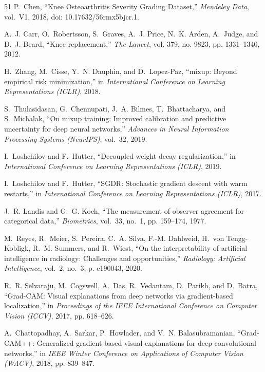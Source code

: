 \documentclass[10pt,journal]{IEEEtran}
\begin{document}
\begin{thebibliography}{51}
P.~Chen, ``Knee Osteoarthritis Severity Grading Dataset,'' \emph{Mendeley Data}, vol.~V1, 2018, doi: 10.17632/56rmx5bjcr.1.

A.~J. Carr, O.~Robertsson, S.~Graves, A.~J. Price, N.~K. Arden, A.~Judge, and D.~J. Beard, ``Knee replacement,'' \emph{The Lancet}, vol. 379, no. 9823, pp. 1331--1340, 2012.

H.~Zhang, M.~Cisse, Y.~N. Dauphin, and D.~Lopez-Paz, ``mixup: Beyond empirical risk minimization,'' in \emph{International Conference on Learning Representations (ICLR)}, 2018.

S.~Thulasidasan, G.~Chennupati, J.~A. Bilmes, T.~Bhattacharya, and S.~Michalak, ``On mixup training: Improved calibration and predictive uncertainty for deep neural networks,'' \emph{Advances in Neural Information Processing Systems (NeurIPS)}, vol.~32, 2019.

I.~Loshchilov and F.~Hutter, ``Decoupled weight decay regularization,'' in \emph{International Conference on Learning Representations (ICLR)}, 2019.

I.~Loshchilov and F.~Hutter, ``SGDR: Stochastic gradient descent with warm restarts,'' in \emph{International Conference on Learning Representations (ICLR)}, 2017.

J.~R. Landis and G.~G. Koch, ``The measurement of observer agreement for categorical data,'' \emph{Biometrics}, vol.~33, no.~1, pp. 159--174, 1977.

M.~Reyes, R.~Meier, S.~Pereira, C.~A. Silva, F.-M. Dahlweid, H.~von Tengg-Kobligk, R.~M. Summers, and R.~Wiest, ``On the interpretability of artificial intelligence in radiology: Challenges and opportunities,'' \emph{Radiology: Artificial Intelligence}, vol.~2, no.~3, p. e190043, 2020.

R.~R. Selvaraju, M.~Cogswell, A.~Das, R.~Vedantam, D.~Parikh, and D.~Batra, ``Grad-CAM: Visual explanations from deep networks via gradient-based localization,'' in \emph{Proceedings of the IEEE International Conference on Computer Vision (ICCV)}, 2017, pp. 618--626.

A.~Chattopadhay, A.~Sarkar, P.~Howlader, and V.~N. Balasubramanian, ``Grad-CAM++: Generalized gradient-based visual explanations for deep convolutional networks,'' in \emph{IEEE Winter Conference on Applications of Computer Vision (WACV)}, 2018, pp. 839--847.


\end{thebibliography}
\end{document}
